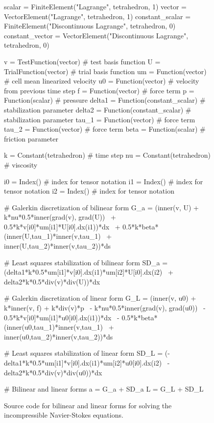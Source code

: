 \begin{figure}[h]
  \begin{python}
scalar = FiniteElement("Lagrange", tetrahedron, 1)
vector = VectorElement("Lagrange", tetrahedron, 1)
constant_scalar = FiniteElement("Discontinuous Lagrange", tetrahedron, 0)
constant_vector = VectorElement("Discontinuous Lagrange", tetrahedron, 0)

v      = TestFunction(vector)      # test basis function
U      = TrialFunction(vector)     # trial basis function
um     = Function(vector)          # cell mean linearized velocity
u0     = Function(vector)          # velocity from previous time step
f      = Function(vector)          # force term
p      = Function(scalar)          # pressure
delta1 = Function(constant_scalar) # stabilization parameter
delta2 = Function(constant_scalar) # stabilization parameter
tau_1  = Function(vector)          # force term
tau_2  = Function(vector)          # force term
beta  = Function(scalar)           # friction parameter

k  = Constant(tetrahedron) # time step
nu = Constant(tetrahedron) # viscosity

i0 = Index()    # index for tensor notation
i1 = Index()    # index for tensor notation
i2 = Index()    # index for tensor notation

# Galerkin discretization of bilinear form
G_a  = (inner(v, U) + k*nu*0.5*inner(grad(v), grad(U)) \
   	+ 0.5*k*v[i0]*um[i1]*U[i0].dx(i1))*dx \
  	 + 0.5*k*beta*(inner(U,tau_1)*inner(v,tau_1) \
  	 + inner(U,tau_2)*inner(v,tau_2))*ds

# Least squares stabilization of bilinear form
SD_a = (delta1*k*0.5*um[i1]*v[i0].dx(i1)*um[i2]*U[i0].dx(i2) \
           + delta2*k*0.5*div(v)*div(U))*dx

# Galerkin discretization of linear form
G_L  = (inner(v, u0) + k*inner(v, f) + k*div(v)*p \
          - k*nu*0.5*inner(grad(v), grad(u0)) \
          - 0.5*k*v[i0]*um[i1]*u0[i0].dx(i1))*dx \
          - 0.5*k*beta*(inner(u0,tau_1)*inner(v,tau_1) \
          + inner(u0,tau_2)*inner(v,tau_2))*ds

# Least squares stabilization of linear form
SD_L = (- delta1*k*0.5*um[i1]*v[i0].dx(i1)*um[i2]*u0[i0].dx(i2) \
           - delta2*k*0.5*div(v)*div(u0))*dx

# Bilinear and linear forms
a = G_a + SD_a
L = G_L + SD_L
\end{python}
\caption{Source code for bilinear and linear forms for solving the incompressible Navier-Stokes equations.}
\label{code:ICNS}
\end{figure}

